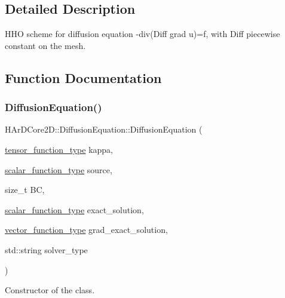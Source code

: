\subsection{Detailed Description}
H\+HO scheme for diffusion equation -\/div(Diff grad u)=f, with Diff piecewise constant on the mesh. 



\subsection{Function Documentation}
\mbox{\label{group__HHO__diffusion_ga9a10d995a8b537474dc0d9a2e0a9a04b}} 
\subsubsection{\texorpdfstring{Diffusion\+Equation()}{DiffusionEquation()}}
{\footnotesize\ttfamily H\+Ar\+D\+Core2\+D\+::\+Diffusion\+Equation\+::\+Diffusion\+Equation (\begin{DoxyParamCaption}\item[{\hyperlink{classHArDCore2D_1_1DiffusionEquation_acb28d76dbd9b3c07f20a996f74915b76}{tensor\+\_\+function\+\_\+type}}]{kappa,  }\item[{\hyperlink{classHArDCore2D_1_1DiffusionEquation_ae1c7c45bf1c9402b11d431716f5e1936}{scalar\+\_\+function\+\_\+type}}]{source,  }\item[{size\+\_\+t}]{BC,  }\item[{\hyperlink{classHArDCore2D_1_1DiffusionEquation_ae1c7c45bf1c9402b11d431716f5e1936}{scalar\+\_\+function\+\_\+type}}]{exact\+\_\+solution,  }\item[{\hyperlink{classHArDCore2D_1_1DiffusionEquation_a8fb1165da7a58b15bc4ed9a86829290a}{vector\+\_\+function\+\_\+type}}]{grad\+\_\+exact\+\_\+solution,  }\item[{std\+::string}]{solver\+\_\+type }\end{DoxyParamCaption})}



Constructor of the class. 


